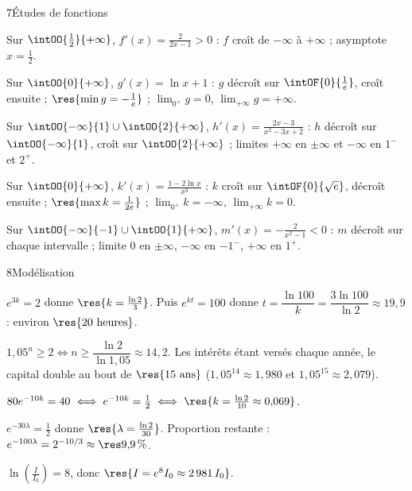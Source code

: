 \begin{deuxcolonnes}
\begin{corrige}{7}{Études de fonctions}
\begin{questions}
  \item Sur $\intOO{\frac12}{+\infty}$, $f'(x)=\frac{2}{2x-1}>0$ : $f$ croît de $-\infty$ à $+\infty$ ; asymptote $x=\frac12$.
  \item Sur $\intOO{0}{+\infty}$, $g'(x)=\ln x+1$ : $g$ décroît sur $\intOF{0}{\frac1e}$, croît ensuite ; $\res{\min g=-\frac1e}$ ;
    $\lim_{0^{+}}g=0$, $\lim_{+\infty}g=+\infty$.
  \item Sur $\intOO{-\infty}{1}\cup\intOO{2}{+\infty}$, $h'(x)=\frac{2x-3}{x^{2}-3x+2}$ : $h$ décroît sur $\intOO{-\infty}{1}$, croît sur
    $\intOO{2}{+\infty}$ ; limites $+\infty$ en $\pm\infty$ et $-\infty$ en $1^{-}$ et $2^{+}$.
  \item Sur $\intOO{0}{+\infty}$, $k'(x)=\frac{1-2\ln x}{x^{3}}$ : $k$ croît sur $\intOF{0}{\sqrt e}$, décroît ensuite ;
    $\res{\max k=\frac{1}{2e}}$ ; $\lim_{0^{+}}k=-\infty$, $\lim_{+\infty}k=0$.
  \item Sur $\intOO{-\infty}{-1}\cup\intOO{1}{+\infty}$, $m'(x)=-\frac{2}{x^{2}-1}<0$ : $m$ décroît sur chaque intervalle ;
    limite $0$ en $\pm\infty$, $-\infty$ en $-1^{-}$, $+\infty$ en $1^{+}$.
\end{questions}
\end{corrige}

\end{deuxcolonnes}

\begin{corrige}{8}{Modélisation}
\begin{questions}
  \item $e^{3k}=2$ donne $\res{k=\frac{\ln2}{3}}$. Puis $e^{kt}=100$ donne $t=\dfrac{\ln100}{k}=\dfrac{3\ln100}{\ln2}\approx19{,}9$ : environ $\res{20\text{ heures}}$.
  \item $1{,}05^{n}\geq2\iff n\geq\dfrac{\ln2}{\ln1{,}05}\approx14{,}2$. Les intérêts étant versés chaque année, le capital double
    au bout de $\res{15\text{ ans}}$ ($1{,}05^{14}\approx1{,}980$ et $1{,}05^{15}\approx2{,}079$).
  \item $80e^{-10k}=40\iff e^{-10k}=\frac12\iff\res{k=\frac{\ln2}{10}\approx0{,}069}$.
  \item $e^{-30\lambda}=\frac12$ donne $\res{\lambda=\frac{\ln2}{30}}$. Proportion restante : $e^{-100\lambda}=2^{-10/3}\approx\res{9{,}9\,\%}$.
  \item $\ln\left(\frac{I}{I_0}\right)=8$, donc $\res{I=e^{8}I_0\approx2\,981\,I_0}$.
\end{questions}
\end{corrige}

